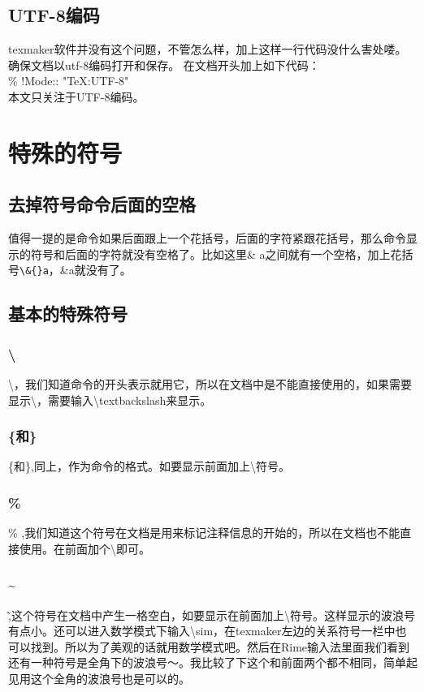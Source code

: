 \documentclass[11pt,oneside]{book}
\begin{document}
\section{UTF-8编码}
texmaker软件并没有这个问题，不管怎么样，加上这样一行代码没什么害处喽。确保文档以utf-8编码打开和保存。
在文档开头加上如下代码：\\
\% !Mode:: "TeX:UTF-8" \\
本文只关注于UTF-8编码。


\chapter{特殊的符号}
\label{sec:symbols}
\section{去掉符号命令后面的空格}
值得一提的是命令如果后面跟上一个花括号，后面的字符紧跟花括号，那么命令显示的符号和后面的字符就没有空格了。比如这里\& a之间就有一个空格，加上花括号\verb+\&{}a+，\&{}a就没有了。

\section{基本的特殊符号}
\subsection{\textbackslash}
\textbackslash ，我们知道命令的开头表示就用它，所以在文档中是不能直接使用的，如果需要显示\textbackslash ，需要输入\textbackslash textbackslash来显示。

\subsection{\{和\}}
\{和\},同上，作为命令的格式。如要显示前面加上\textbackslash 符号。

\subsection{\%}
\% ,我们知道这个符号在文档是用来标记注释信息的开始的，所以在文档也不能直接使用。在前面加个\textbackslash 即可。

\subsection{\~{}}
\~ ,这个符号在文档中产生一格空白，如要显示在前面加上\textbackslash 符号。这样显示的波浪号有点小。还可以进入数学模式下输入\textbackslash sim，在texmaker左边的关系符号一栏中也可以找到。所以为了美观的话就用数学模式吧。然后在Rime输入法里面我们看到还有一种符号是全角下的波浪号～。我比较了下这个和前面两个都不相同，简单起见用这个全角的波浪号也是可以的。
\end{document}
